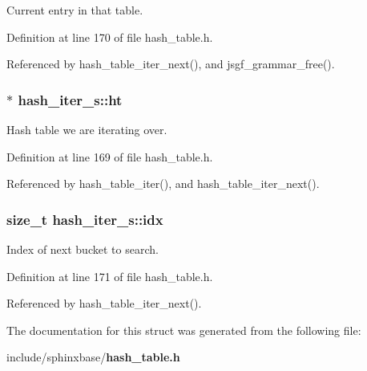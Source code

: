 Current entry in that table. 



Definition at line 170 of file hash\+\_\+table.\+h.



Referenced by hash\+\_\+table\+\_\+iter\+\_\+next(), and jsgf\+\_\+grammar\+\_\+free().

\subsubsection[{ht}]{$\ast$ hash\+\_\+iter\+\_\+s\+::ht}\label{structhash__iter__s_a02844d3426aaa62e41086c98a052ed7d}


Hash table we are iterating over. 



Definition at line 169 of file hash\+\_\+table.\+h.



Referenced by hash\+\_\+table\+\_\+iter(), and hash\+\_\+table\+\_\+iter\+\_\+next().

\subsubsection[{idx}]{\setlength{\rightskip}{0pt plus 5cm}size\+\_\+t hash\+\_\+iter\+\_\+s\+::idx}\label{structhash__iter__s_a9cb2842206d721ef3ef9b15c133ba3c9}


Index of next bucket to search. 



Definition at line 171 of file hash\+\_\+table.\+h.



Referenced by hash\+\_\+table\+\_\+iter\+\_\+next().



The documentation for this struct was generated from the following file\+:\begin{DoxyCompactItemize}
\item 
include/sphinxbase/{\bf hash\+\_\+table.\+h}\end{DoxyCompactItemize}
